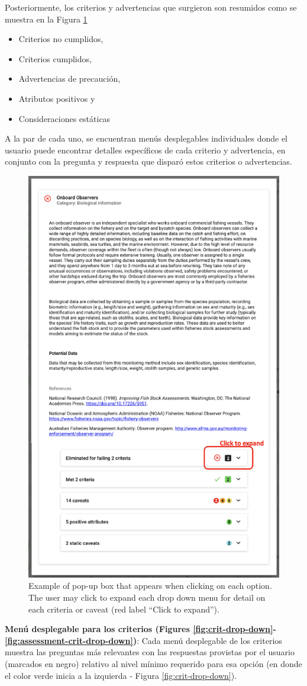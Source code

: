 \documentclass[
  11pt,
]{book}
\providecommand{\tightlist}{%
  \setlength{\itemsep}{0pt}\setlength{\parskip}{0pt}}
\begin{document}
Posteriormente, los criterios y advertencias que surgieron son resumidos como se muestra en la Figura \ref{fig:opt-desc}

\begin{itemize}
\tightlist
\item
  Criterios no cumplidos,
\item
  Criterios cumplidos,
\item
  Advertencias de precaución,
\item
  Atributos positivos y
\item
  Consideraciones estáticas
\end{itemize}

A la par de cada uno, se encuentran menús desplegables individuales donde el usuario puede encontrar detalles específicos de cada criterio y advertencia, en conjunto con la pregunta y respuesta que disparó estos criterios o advertencias.

\begin{figure}

{\centering \includegraphics[width=0.5\linewidth]{images/option-description} 

}

\caption{Example of pop-up box that appears when clicking on each option. The user may click to expand each drop down menu for detail on each criteria or caveat (red label “Click to expand”).}\label{fig:opt-desc}
\end{figure}

\textbf{Menú desplegable para los criterios (Figures \ref{fig:crit-drop-down}-\ref{fig:assessment-crit-drop-down})}: Cada menú desplegable de los criterios muestra las preguntas más relevantes con las respuestas provistas por el usuario (marcados en negro) relativo al nivel mínimo requerido para esa opción (en donde el color verde inicia a la izquierda - Figura \ref{fig:crit-drop-down}).
\end{document}
